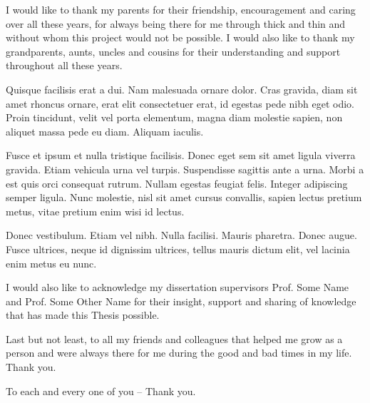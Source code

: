 
I would like to thank my parents for their friendship, encouragement and caring over all these years, for always being there for me through thick and thin and without whom this project would not be possible. I would also like to thank my grandparents, aunts, uncles and cousins for their understanding and support throughout all these years.

Quisque facilisis erat a dui. Nam malesuada ornare dolor. Cras gravida, diam sit amet rhoncus ornare, erat elit consectetuer erat, id egestas pede nibh eget odio. Proin tincidunt, velit vel porta elementum, magna diam molestie sapien, non aliquet massa pede eu diam. Aliquam iaculis. 

Fusce et ipsum et nulla tristique facilisis. Donec eget sem sit amet ligula viverra gravida. Etiam vehicula urna vel turpis. Suspendisse sagittis ante a urna. Morbi a est quis orci consequat rutrum. Nullam egestas feugiat felis. Integer adipiscing semper ligula. Nunc molestie, nisl sit amet cursus convallis, sapien lectus pretium metus, vitae pretium enim wisi id lectus. 

Donec vestibulum. Etiam vel nibh. Nulla facilisi. Mauris pharetra. Donec augue. Fusce ultrices, neque id dignissim ultrices, tellus mauris dictum elit, vel lacinia enim metus eu nunc.

I would also like to acknowledge my dissertation supervisors Prof. Some Name and Prof. Some Other Name for their insight, support and sharing of knowledge that has made this Thesis possible.

Last but not least, to all my friends and colleagues that helped me grow as a person and were always there for me during the good and bad times in my life. Thank you.

To each and every one of you -- Thank you.